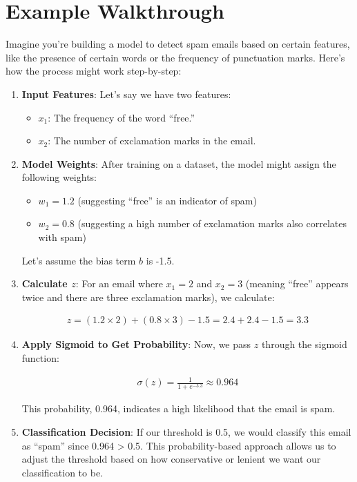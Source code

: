 \documentclass[
  12 pt,
  a4paper,
]{book}
\providecommand{\tightlist}{%
  \setlength{\itemsep}{0pt}\setlength{\parskip}{0pt}}
\numberwithin{equation}{section}
\theoremstyle{plain}      %
\theoremstyle{definition} %
\theoremstyle{remark}     %
\theoremstyle{note}         %
\begin{document}
\hypertarget{example-walkthrough}{%
\section{Example Walkthrough}\label{example-walkthrough}}

Imagine you're building a model to detect spam emails based on certain
features, like the presence of certain words or the frequency of
punctuation marks. Here's how the process might work step-by-step:

\begin{enumerate}
\def\labelenumi{\arabic{enumi}.}
\item
  \textbf{Input Features}: Let's say we have two features:

  \begin{itemize}
  \tightlist
  \item
    \(x_1\): The frequency of the word ``free.''
  \item
    \(x_2\): The number of exclamation marks in the email.
  \end{itemize}
\item
  \textbf{Model Weights}: After training on a dataset, the model might
  assign the following weights:

  \begin{itemize}
  \tightlist
  \item
    \(w_1 = 1.2\) (suggesting ``free'' is an indicator of spam)
  \item
    \(w_2 = 0.8\) (suggesting a high number of exclamation marks also
    correlates with spam)
  \end{itemize}

  Let's assume the bias term \(b\) is -1.5.
\item
  \textbf{Calculate \(z\)}: For an email where \(x_1 = 2\) and
  \(x_2 = 3\) (meaning ``free'' appears twice and there are three
  exclamation marks), we calculate:

  \begin{align}
  z = (1.2 \times 2) + (0.8 \times 3) - 1.5 = 2.4 + 2.4 - 1.5 = 3.3
  \end{align}
\item
  \textbf{Apply Sigmoid to Get Probability}: Now, we pass \(z\) through
  the sigmoid function:

  \begin{align}
  \sigma(z) = \frac{1}{1 + e^{-3.3}} \approx 0.964
  \end{align}

  This probability, 0.964, indicates a high likelihood that the email is
  spam.
\item
  \textbf{Classification Decision}: If our threshold is 0.5, we would
  classify this email as ``spam'' since 0.964 \textgreater{} 0.5. This
  probability-based approach allows us to adjust the threshold based on
  how conservative or lenient we want our classification to be.
\end{enumerate}
\end{document}
